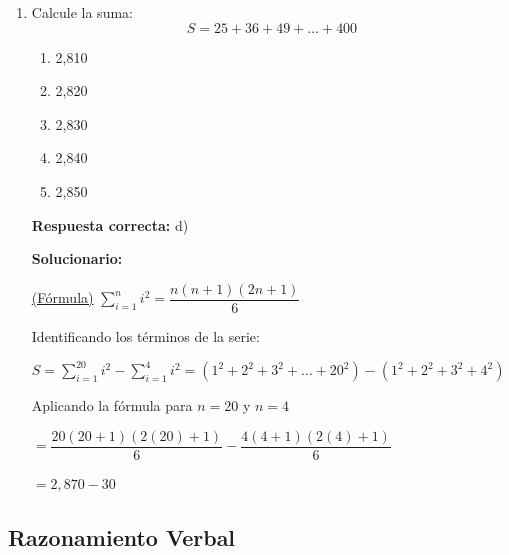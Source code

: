 \begin{enumerate}[resume]
	\textbf{Respuesta correcta:} a)
	
	\vspace{2mm}
	\textbf{Solucionario:}
	
	Dando la forma de la definición:\\
	$$128 \circledast 243 = 2 \cdot 4^3 \circledast 3 \cdot 3^4$$\\
	De donde se obtiene que:\\
	$a = 4$ y $b = 3$
	
	Reemplazando:\\
	$\Rightarrow \sqrt{4^2 + 3^2}$\\
	$= \sqrt{16 + 9} = \sqrt{25} =$\\
	
	\vspace{5mm}


	\item Calcule la suma:
	$$S = 25 + 36 + 49 + \dots + 400$$
	
	\begin{enumerate}[label=\alph*)]
		\item 2,810
		\item 2,820
		\item 2,830
		\item 2,840
		\item 2,850
	\end{enumerate}
	
	\textbf{Respuesta correcta:} d)
	
	\vspace{2mm}
	\textbf{Solucionario:}
	
	\underline{(Fórmula)}
	$\sum_{i=1}^{n} i^2 = \dfrac{n(n+1)(2n+1)}{6}$
	
	Identificando los términos de la serie:
	
	$S = \sum_{i=1}^{20} i^2 - \sum_{i=1}^{4} i^2 = (1^2 + 2^2 + 3^2 + \dots + 20^2) - (1^2 + 2^2 + 3^2 + 4^2)$
	
	Aplicando la fórmula para $n=20$ y $n=4$
	
	$= \dfrac{20(20+1)(2(20)+1)}{6} - \dfrac{4(4+1)(2(4)+1)}{6}$
	
	$= 2,870 - 30$
	
	
	\vspace{6mm}
	
	
\end{enumerate}





\subsection*{Razonamiento Verbal}

